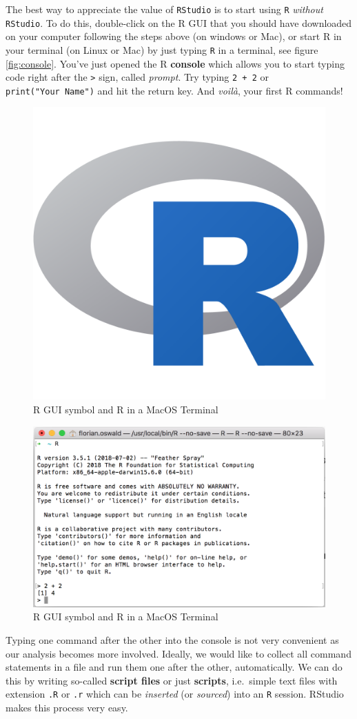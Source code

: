\documentclass[]{book}
\theoremstyle{definition}
\theoremstyle{definition}
\theoremstyle{definition}
\theoremstyle{remark}
\begin{document}
The best way to appreciate the value of \texttt{RStudio} is to start
using \texttt{R} \emph{without} \texttt{RStudio}. To do this,
double-click on the R GUI that you should have downloaded on your
computer following the steps above (on windows or Mac), or start R in
your terminal (on Linux or Mac) by just typing \texttt{R} in a terminal,
see figure \ref{fig:console}. You've just opened the R \textbf{console}
which allows you to start typing code right after the
\texttt{\textgreater{}} sign, called \emph{prompt}. Try typing
\texttt{2\ +\ 2} or \texttt{print("Your\ Name")} and hit the return key.
And \emph{voilà}, your first R commands!

\begin{figure}

{\centering \includegraphics[width=0.5\linewidth]{images/RLogo} 

}

\caption{R GUI symbol and R in a MacOS Terminal}\label{fig:console1}
\end{figure}\begin{figure}

{\centering \includegraphics[width=0.5\linewidth]{images/console} 

}

\caption{R GUI symbol and R in a MacOS Terminal}\label{fig:console2}
\end{figure}

Typing one command after the other into the console is not very
convenient as our analysis becomes more involved. Ideally, we would like
to collect all command statements in a file and run them one after the
other, automatically. We can do this by writing so-called \textbf{script
files} or just \textbf{scripts}, i.e.~simple text files with extension
\texttt{.R} or \texttt{.r} which can be \emph{inserted} (or
\emph{sourced}) into an \texttt{R} session. RStudio makes this process
very easy.
\end{document}
